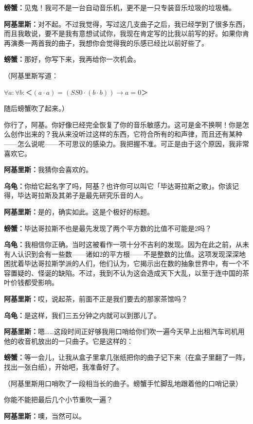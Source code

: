 \documentclass[
  12pt,
  twoside,
  openright,
  oldfontcommands,
]{memoir}
\newcommand{\kaitismall}[1]{{\kaitifamily\small #1}}
\newcommand{\dialogname}[1]{{\heifamily\bfseries #1}}
\begin{document}
\dialogname{螃蟹：}见鬼！我可不是一台自动音乐机，更不是一只专装音乐垃圾的垃圾桶。

\dialogname{阿基里斯：}对不起。不过我觉得，写过这几支曲子之后，我已经学到了很多东西，而且我敢说，要不是我有意想试试你，我现在肯定写的比我以前写的好。如果你肯再演奏一两首我的曲子，我想你会觉得我的乐感已经比以前好些了。

\dialogname{螃蟹：}那好，你写下来，我再给你一次机会。

（阿基里斯写道：

$\forall a:\forall b:＜(a\cdot a)=(SS0\cdot (b\cdot b))\rightarrow a=0＞$

随后螃蟹吹了起来。）

你行了，阿基。你好像已经完全恢复了你的音乐敏感力。这可是金不换啊！你是怎么创作出来的？我从来没听过这样的东西，它符合所有的和声律，而且还有某种------怎么说呢------不可思议的感染力。我把握不准。可正是由于这个原因，我非常喜欢它。

\dialogname{阿基里斯：}我猜你会喜欢的。

\dialogname{乌龟：}你给它起名字了吗，阿基？也许你可以叫它「毕达哥拉斯之歌」。你该记得，毕达哥拉斯及其弟子是最先研究乐音的人。

\dialogname{阿基里斯：}是的，确实如此。这是个极好的标题。

\dialogname{螃蟹：}毕达哥拉斯不也是最先发现了两个平方数的比值不可能是2吗？

\dialogname{乌龟：}我相信你正确。当时这被看作一项十分不吉利的发现。因为在此之前，从未有人认识到会有一些数------诸如2的平方根------不是整数的比值。这项发现深深地困扰着毕达哥拉斯学派的人们，他们认为，它揭示出在数的抽象世界中，有一个不容置疑的、怪诞的缺陷。不过，我到不认为这会造成天下大乱，以至于连中国的茶叶价钱都受影响。

\dialogname{阿基里斯：}哎，说起茶，前面不正是我们要去的那家茶馆吗？

\dialogname{乌龟：}是这样，我们三五分钟之内就可以到那儿了。

\dialogname{阿基里斯：}嗯\ldots\ldots 这段时间正好够我用口哨给你们吹一遍今天早上出租汽车司机用他的收音机放出的一只曲子。它是这样的：

\dialogname{螃蟹：}等一会儿，让我从盒子里拿几张纸把你的曲子记下来\kaitismall{（在盒子里翻了一阵，找出一张白纸）}，开始吧，我准备好了。

（阿基里斯用口哨吹了一段相当长的曲子。螃蟹手忙脚乱地跟着他的口哨记录）

你能不能把最后几个小节重吹一遍？

\dialogname{阿基里斯：}噢，当然可以。
\end{document}
